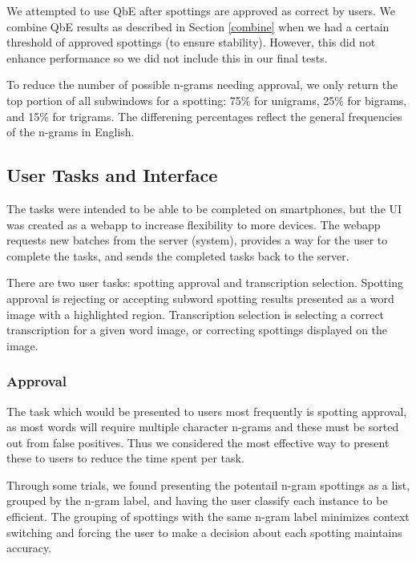 \documentclass[ms,electronic,twosidetoc,letterpaper,chaptercenter,parttop,lol,lof,lot]{byumsphd}
\begin{document}
We attempted to use QbE after spottings are approved as correct by users. We combine QbE results as described in Section \ref{combine} when we had a certain threshold of approved spottings (to ensure stability). However, this did not enhance performance so we did not include this in our final tests.

To reduce the number of possible n-grams needing approval, we only return the top portion of all subwindows for a spotting: 75\% for unigrams, 25\% for bigrams, and 15\% for trigrams. The differening percentages reflect the general frequencies of the n-grams in English.

\subsection{User Tasks and Interface}

The tasks were intended to be able to be completed on smartphones, but the UI was created as a webapp to increase flexibility to more devices. The webapp requests new batches from the server (system), provides a way for the user to complete the tasks, and sends the completed tasks back to the server.

There are two user tasks: spotting approval and transcription selection. Spotting approval is rejecting or accepting subword spotting results presented as a word image with a highlighted region. Transcription selection is selecting a correct transcription for a given word image, or correcting spottings displayed on the image. 

\subsubsection{Approval}

The task which would be presented to users most frequently is spotting approval, as most words will require multiple character n-grams and these must be sorted out from false positives. Thus we considered the most effective way to present these to users to reduce the time spent per task.


Through some trials, we found presenting the potentail n-gram spottings as a list, grouped by the n-gram label, and having the user classify each instance to be efficient. The grouping of spottings with the same n-gram label minimizes context switching and forcing the user to make a decision about each spotting maintains accuracy.
\end{document}
